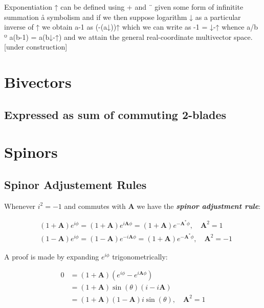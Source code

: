 \documentclass[a4paper]{book}
\numberwithin{equation}{chapter}
\begin{document}
\vspace{\baselineskip}

Exponentiation ↑ can be defined using + and ¨ given some form of infinitite summation å symbolism and if we then suppose logarithm ↓ as a particular inverse of ↑ we obtain a-1 as (-(a↓))↑ which we can write as -1 = ↓-↑ whence a/b º a(b-1)   =   a(b↓-↑) and we attain the general real-coordinate multivector space. [under construction] 

    \section{Bivectors}

    \subsection{Expressed as sum of commuting 2-blades}

    \section{Spinors}

    

    \subsection{Spinor Adjustement Rules}

Whenever $i^2=-1$ and commutes with $\mathbf{A}$ 
we have the \emph{\textbf{spinor adjustment rule}}:

\begin{tcolorbox}[colback=white, colframe=blue!10!black, title=\textbf{Spinor
Adjustement Rules} ]

\begin{align*}
    &(1+\mathbf{A})e^{i\phi} = (1+\mathbf{A})e^{i\mathbf{A}\phi} =
    (1+\mathbf{A})e^{-\mathbf{A}^* \phi}, \quad \mathbf{A}^2=1
\\
    &(1-\mathbf{A})e^{i\phi} = (1-\mathbf{A})e^{-i\mathbf{A}\phi} =
    (1+\mathbf{A})e^{-\mathbf{A}^* \phi}, \quad \mathbf{A}^2=-1 
\end{align*}

\end{tcolorbox} 

A proof is made by expanding $e^{i\phi}$ trigonometrically:

\begin{align*}
    0&=(1+\mathbf{A})(e^{i\phi}-e^{i\mathbf{A}\phi})\\
    &=(1+\mathbf{A})\sin(\theta)(i-i\mathbf{A}) \\
    &=(1+\mathbf{A})(1-\mathbf{A})i\sin(\theta), \quad
    \mathbf{A}^2=1
\end{align*}
\end{document}
